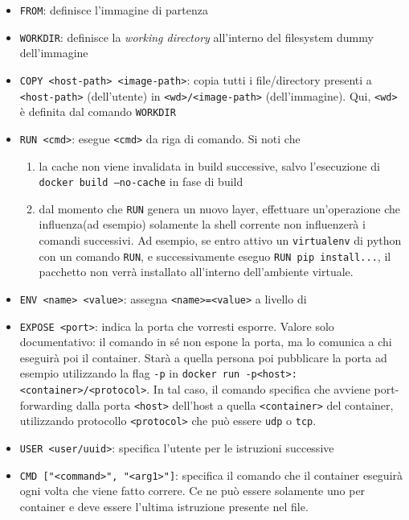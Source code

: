 \documentclass[a4paper, 11pt]{article}
\newcommand{\refterm}[1]{\nameref{term:#1}}
\begin{document}
\begin{itemize}
	\item \texttt{FROM}: definisce l'immagine di partenza
	\item \texttt{WORKDIR}: definisce la \textit{working directory} all'interno del filesystem dummy dell'immagine
	\item \texttt{COPY <host-path> <image-path>}: copia tutti i file/directory presenti a \texttt{<host-path>} (dell'utente) in \texttt{<wd>/<image-path>} (dell'immagine). Qui, \texttt{<wd>} è definita dal comando \texttt{WORKDIR}
	\item \texttt{RUN <cmd>}: esegue \texttt{<cmd>} da riga di comando. Si noti che
	      \begin{enumerate}
		      \item la cache non viene invalidata in build successive, salvo l'esecuzione di \texttt{docker build --no-cache} in fase di build
		      \item dal momento che \texttt{RUN} genera un nuovo layer, effettuare un'operazione che influenza(ad esempio) solamente la shell corrente non influenzerà i comandi successivi. Ad esempio, se entro attivo un \texttt{virtualenv} di python con un comando \texttt{RUN}, e successivamente eseguo \texttt{RUN pip install...}, il pacchetto non verrà installato all'interno dell'ambiente virtuale.
	      \end{enumerate}
	\item \texttt{ENV <name> <value>}: assegna \texttt{<name>=<value>} a livello di \refterm{Ambiente}
	\item \texttt{EXPOSE <port>}: indica la porta che vorresti esporre. Valore solo documentativo: il comando in sé non espone la porta, ma lo comunica a chi eseguirà poi il container. Starà a quella persona poi pubblicare la porta ad esempio utilizzando la flag \texttt{-p} in \texttt{docker run -p<host>:<container>/<protocol>}. In tal caso, il comando specifica che avviene port-forwarding dalla porta \texttt{<host>} dell'host a quella \texttt{<container>} del container, utilizzando protocollo \texttt{<protocol>} che può essere \texttt{udp} o \texttt{tcp}.
	\item \texttt{USER <user/uuid>}: specifica l'utente per le istruzioni successive
	\item \texttt{CMD ["<command>", "<arg1>"]}: specifica il comando che il container eseguirà ogni volta che viene fatto correre. Ce ne può essere solamente uno per container e deve essere l'ultima istruzione presente nel file.
\end{itemize}
\end{document}
